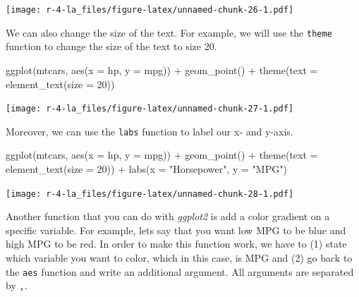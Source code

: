 \documentclass[
]{book}
\newenvironment{Shaded}{\begin{snugshade}}{\end{snugshade}}
\newcommand{\AttributeTok}[1]{\textcolor[rgb]{0.77,0.63,0.00}{#1}}
\newcommand{\DecValTok}[1]{\textcolor[rgb]{0.00,0.00,0.81}{#1}}
\newcommand{\FunctionTok}[1]{\textcolor[rgb]{0.00,0.00,0.00}{#1}}
\newcommand{\NormalTok}[1]{#1}
\newcommand{\SpecialCharTok}[1]{\textcolor[rgb]{0.00,0.00,0.00}{#1}}
\newcommand{\StringTok}[1]{\textcolor[rgb]{0.31,0.60,0.02}{#1}}
\begin{document}
\texttt{[image: r-4-la\_files/figure-latex/unnamed-chunk-26-1.pdf]}

We can also change the size of the text. For example, we will use the \texttt{theme} function to change the size of the text to size 20.

\begin{Shaded}
\begin{Highlighting}[]
\FunctionTok{ggplot}\NormalTok{(mtcars, }\FunctionTok{aes}\NormalTok{(}\AttributeTok{x =}\NormalTok{ hp, }\AttributeTok{y =}\NormalTok{ mpg)) }\SpecialCharTok{+} 
      \FunctionTok{geom\_point}\NormalTok{() }\SpecialCharTok{+} 
      \FunctionTok{theme}\NormalTok{(}\AttributeTok{text =} \FunctionTok{element\_text}\NormalTok{(}\AttributeTok{size =} \DecValTok{20}\NormalTok{))}
\end{Highlighting}
\end{Shaded}

\texttt{[image: r-4-la\_files/figure-latex/unnamed-chunk-27-1.pdf]}

Moreover, we can use the \texttt{labs} function to label our x- and y-axis.

\begin{Shaded}
\begin{Highlighting}[]
\FunctionTok{ggplot}\NormalTok{(mtcars, }\FunctionTok{aes}\NormalTok{(}\AttributeTok{x =}\NormalTok{ hp, }\AttributeTok{y =}\NormalTok{ mpg)) }\SpecialCharTok{+} 
      \FunctionTok{geom\_point}\NormalTok{() }\SpecialCharTok{+} 
      \FunctionTok{theme}\NormalTok{(}\AttributeTok{text =} \FunctionTok{element\_text}\NormalTok{(}\AttributeTok{size =} \DecValTok{20}\NormalTok{)) }\SpecialCharTok{+} 
      \FunctionTok{labs}\NormalTok{(}\AttributeTok{x =} \StringTok{"Horsepower"}\NormalTok{, }\AttributeTok{y =} \StringTok{"MPG"}\NormalTok{)}
\end{Highlighting}
\end{Shaded}

\texttt{[image: r-4-la\_files/figure-latex/unnamed-chunk-28-1.pdf]}

Another function that you can do with \emph{ggplot2} is add a color gradient on a specific variable. For example, lets say that you want low MPG to be blue and high MPG to be red. In order to make this function work, we have to (1) state which variable you want to color, which in this case, is MPG and (2) go back to the \texttt{aes} function and write an additional argument. All arguments are separated by \texttt{,}.
\end{document}
